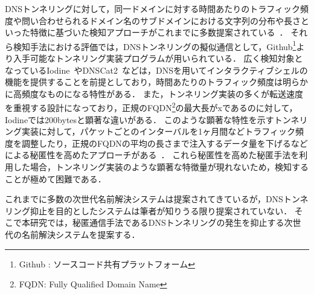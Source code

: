 DNSトンネリングに対して，同一ドメインに対する時間あたりのトラフィック頻度や問い合わせられるドメイン名のサブドメインにおける文字列の分布や長さといった特徴に基づいた検知アプローチがこれまでに多数提案されている~\cite{born, cheng, liu, asaf, steadman, jawad}．
それら検知手法における評価では，DNSトンネリングの擬似通信として，Github\footnote{Github : ソースコード共有プラットフォーム}より入手可能なトンネリング実装プログラムが用いられている．
広く検知対象となっているIodine~\cite{iodine}やDNSCat2~\cite{dnscat2}などは，DNSを用いてインタラクティブシェルの機能を提供することを前提としており，時間あたりのトラフィック頻度は明らかに高頻度なものになる特性がある．
また，トンネリング実装の多くが転送速度を重視する設計になっており，正規のFQDN\footnote{FQDN: Fully Qualified Domain Name}の最大長がxであるのに対して，Iodineでは200bytesと顕著な違いがある．
このような顕著な特性を示すトンネリング実装に対して，パケットごとのインターバルを1ヶ月間などトラフィック頻度を調整したり，正規のFQDNの平均の長さまで注入するデータ量を下げるなどによる秘匿性を高めたアプローチがある~\cite{asaf}．
これら秘匿性を高めた秘匿手法を利用した場合，トンネリング実装のような顕著な特徴量が現れないため，検知することが極めて困難である．

これまでに多数の次世代名前解決システムは提案されてきているが，DNSトンネリング抑止を目的としたシステムは筆者が知りうる限り提案されていない．
そこで本研究では，秘匿通信手法であるDNSトンネリングの発生を抑止する次世代の名前解決システムを提案する．


